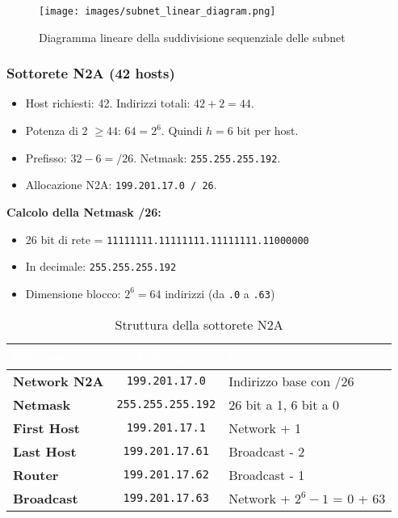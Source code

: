 \begin{figure}[H]
    \centering
    \texttt{[image: images/subnet\_linear\_diagram.png]}
    \caption{Diagramma lineare della suddivisione sequenziale delle subnet}
    \label{fig:subnet_linear}
\end{figure}
        

\subsubsection{Sottorete N2A (42 hosts)}
\begin{itemize}
    \item Host richiesti: 42. Indirizzi totali: $42 + 2 = 44$.
    \item Potenza di 2 $\geq 44$: $64 = 2^6$. Quindi $h=6$ bit per host.
    \item Prefisso: $32 - 6 = /26$. Netmask: \texttt{255.255.255.192}.
    \item Allocazione N2A: \texttt{199.201.17.0 / 26}.
\end{itemize}

\textbf{Calcolo della Netmask /26:}
\begin{itemize}
    \item 26 bit di rete = \texttt{11111111.11111111.11111111.11000000}
    \item In decimale: \texttt{255.255.255.192}
    \item Dimensione blocco: $2^6 = 64$ indirizzi (da \texttt{.0} a \texttt{.63})
\end{itemize}

\begin{table}[h]
\centering
\begin{tabular}{|l|c|l|}
\hline
\rowcolor{bg_custom}
\textcolor{white}{\textbf{Elemento}} & \textcolor{white}{\textbf{Indirizzo}} & \textcolor{white}{\textbf{Calcolo}} \\
\hline
\textbf{Network N2A} & \texttt{199.201.17.0} & Indirizzo base con /26 \\
\hline
\textbf{Netmask} & \texttt{255.255.255.192} & 26 bit a 1, 6 bit a 0 \\
\hline
\textbf{First Host} & \texttt{199.201.17.1} & Network + 1 \\
\hline
\textbf{Last Host} & \texttt{199.201.17.61} & Broadcast - 2 \\
\hline
\textbf{Router} & \texttt{199.201.17.62} & Broadcast - 1 \\
\hline
\textbf{Broadcast} & \texttt{199.201.17.63} & Network + $2^6 - 1$ = 0 + 63 \\
\hline
\end{tabular}
\caption{Struttura della sottorete N2A}
\end{table}


